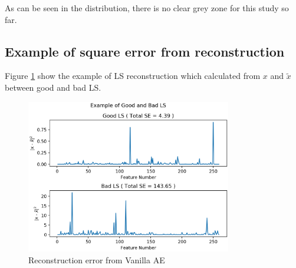 As can be seen in the distribution, there is no clear grey zone for this study so far.

\subsection{Example of square error from reconstruction}
Figure \ref{fig:2016_example_se} show the example of LS reconstruction which calculated from $x$ and $\tilde{x}$ between good and bad LS.
\begin{figure}[h!]
    \centering
    \includegraphics[width=0.8\textwidth]{images/reco/2016/example_se.png}
    \caption{Reconstruction error from Vanilla AE}
    \label{fig:2016_example_se}
\end{figure}

